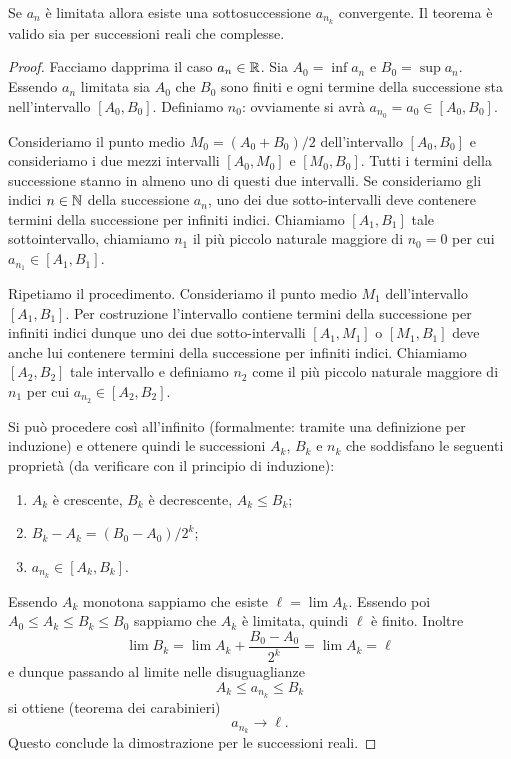 \begin{theorem}
\mymark{***}
Se $a_n$ è limitata allora esiste una sottosuccessione
$a_{n_k}$ convergente. Il teorema è valido sia per successioni reali
che complesse.
\end{theorem}
%
\begin{proof}
Facciamo dapprima il caso $a_n\in \mathbb R$.
\mymark{***}
Sia $A_0=\inf a_n$ e $B_0=\sup a_n$. Essendo $a_n$ limitata
sia $A_0$
che $B_0$ sono finiti e ogni termine della successione sta
nell'intervallo $[A_0,B_0]$. Definiamo $n_0$: ovviamente si avrà $a_{n_0} = a_0 \in [A_0, B_0]$.

Consideriamo il punto medio $M_0 = (A_0+B_0)/2$ dell'intervallo $[A_0,B_0]$ e consideriamo i due mezzi intervalli $[A_0,M_0]$ e $[M_0,B_0]$. Tutti i termini della successione stanno in almeno
uno di questi due intervalli.
Se consideriamo gli indici $n\in \mathbb N$ della successione $a_n$, uno dei due sotto-intervalli deve contenere termini
della successione per infiniti indici.
Chiamiamo $[A_1, B_1]$
tale sottointervallo,
chiamiamo $n_1$ il più piccolo naturale maggiore di $n_0=0$
per cui $a_{n_1} \in [A_1,  B_1]$.

Ripetiamo il procedimento.
Consideriamo il punto medio $M_1$ dell'intervallo $[A_1,B_1]$.
Per costruzione l'intervallo contiene termini della successione
per infiniti indici dunque uno dei due sotto-intervalli $[A_1,M_1]$
o $[M_1,B_1]$ deve anche lui
contenere termini della successione per infiniti indici. Chiamiamo
$[A_2, B_2]$ tale intervallo e definiamo $n_2$ come il più piccolo
naturale maggiore di $n_1$ per cui $a_{n_2}\in [A_2, B_2]$.

Si può procedere così all'infinito (formalmente: tramite una definizione per induzione)
e ottenere quindi le successioni $A_k$, $B_k$ e $n_k$ che soddisfano le seguenti proprietà (da verificare con il principio di induzione):
\begin{enumerate}
\item $A_k$ è crescente, $B_k$ è decrescente, $A_k \le B_k$;
\item $B_k - A_k = (B_0-A_0)/2^k$;
\item $a_{n_k} \in [A_k, B_k]$.
\end{enumerate}

Essendo $A_k$ monotona sappiamo che esiste $\ell = \lim A_k$. Essendo poi $A_0 \le A_k \le B_k \le B_0$ sappiamo che $A_k$ è limitata, quindi $\ell$ è finito.
Inoltre
\[
 \lim B_k = \lim A_k + \frac{B_0-A_0}{2^k} = \lim A_k = \ell
 \]
 e dunque
passando al limite nelle disuguaglianze
\[
   A_k \le a_{n_k} \le B_k
\]
si ottiene (teorema dei carabinieri)
\[
  a_{n_k} \to \ell.
\]
Questo conclude la dimostrazione per le successioni reali.


\end{proof}
